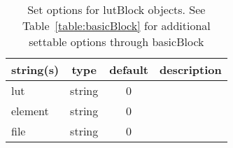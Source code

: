 \begin{table}[ht]
\centering
\begin{tabular}{p{5cm} c c p{7cm}}
\hline
string(s) & type & default & description \\
\hline
lut & string & 0 & \\
element & string & 0 & \\
file & string & 0 & \\
\hline
\end{tabular}
\caption{Set options for lutBlock objects. See Table~\ref{table:basicBlock} for additional settable options through basicBlock}
\label{table:lutBlock}
\end{table}
